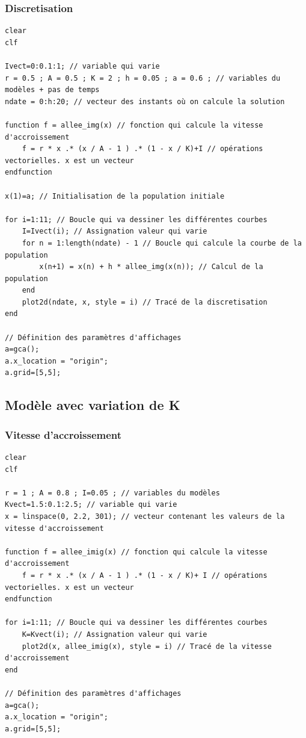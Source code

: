 \documentclass{article}
\begin{document}
\subsubsection{Discretisation}

\begin{verbatim}
clear
clf

Ivect=0:0.1:1; // variable qui varie
r = 0.5 ; A = 0.5 ; K = 2 ; h = 0.05 ; a = 0.6 ; // variables du modèles + pas de temps
ndate = 0:h:20; // vecteur des instants où on calcule la solution

function f = allee_img(x) // fonction qui calcule la vitesse d'accroissement
    f = r * x .* (x / A - 1 ) .* (1 - x / K)+I // opérations vectorielles. x est un vecteur
endfunction

x(1)=a; // Initialisation de la population initiale

for i=1:11; // Boucle qui va dessiner les différentes courbes
    I=Ivect(i); // Assignation valeur qui varie
    for n = 1:length(ndate) - 1 // Boucle qui calcule la courbe de la population
        x(n+1) = x(n) + h * allee_img(x(n)); // Calcul de la population
    end 
    plot2d(ndate, x, style = i) // Tracé de la discretisation
end

// Définition des paramètres d'affichages
a=gca();
a.x_location = "origin";
a.grid=[5,5];
\end{verbatim}

\subsection{Modèle avec variation de K}

\subsubsection{Vitesse d'accroissement}

\begin{verbatim}
clear
clf

r = 1 ; A = 0.8 ; I=0.05 ; // variables du modèles
Kvect=1.5:0.1:2.5; // variable qui varie
x = linspace(0, 2.2, 301); // vecteur contenant les valeurs de la vitesse d'accroissement

function f = allee_imig(x) // fonction qui calcule la vitesse d'accroissement
    f = r * x .* (x / A - 1 ) .* (1 - x / K)+ I // opérations vectorielles. x est un vecteur
endfunction

for i=1:11; // Boucle qui va dessiner les différentes courbes
    K=Kvect(i); // Assignation valeur qui varie
    plot2d(x, allee_imig(x), style = i) // Tracé de la vitesse d'accroissement
end

// Définition des paramètres d'affichages
a=gca();
a.x_location = "origin";
a.grid=[5,5];
\end{verbatim}
\end{document}
